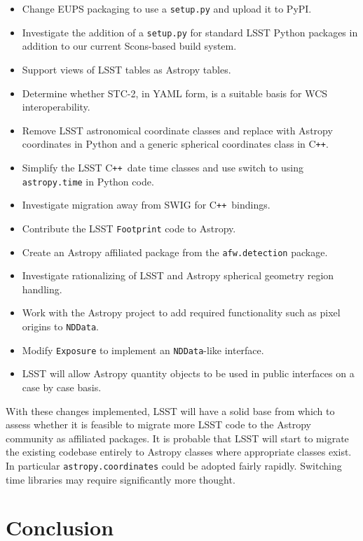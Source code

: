 \documentclass[]{spie}  %
\newcommand{\CPP}{C\texttt{++}\xspace}  %
\begin{document}
\begin{itemize}
\item Change EUPS packaging to use a \texttt{setup.py} and upload it to PyPI.
\item Investigate the addition of a \texttt{setup.py} for standard LSST Python packages in addition to our current Scons-based build system.
\item Support views of LSST tables as Astropy tables.
\item Determine whether STC-2, in YAML form, is a suitable basis for WCS interoperability.
\item Remove LSST astronomical coordinate classes and replace with Astropy coordinates in Python and a generic spherical coordinates class in \CPP.
\item Simplify the LSST \CPP\ date time classes and use switch to using \texttt{astropy.time} in Python code.
\item Investigate migration away from SWIG for \CPP\ bindings.
\item Contribute the LSST \texttt{Footprint} code to Astropy.
\item Create an Astropy affiliated package from the \texttt{afw.detection} package.
\item Investigate rationalizing of LSST and Astropy spherical geometry region handling.
\item Work with the Astropy project to add required functionality such as pixel origins to \texttt{NDData}.
\item Modify \texttt{Exposure} to implement an \texttt{NDData}-like interface.
\item LSST will allow Astropy quantity objects to be used in public interfaces on a case by case basis.

\end{itemize}

With these changes implemented, LSST will have a solid base from which to assess whether it is feasible to migrate more LSST code to the Astropy community as affiliated packages.
It is probable that LSST will start to migrate the existing codebase entirely to Astropy classes where appropriate classes exist.
In particular \texttt{astropy.coordinates} could be adopted fairly rapidly.
Switching time libraries may require significantly more thought.

\section{Conclusion}
\end{document}

